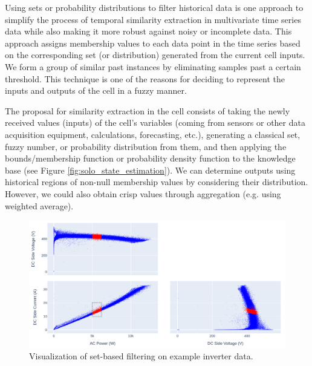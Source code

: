 Using sets or probability distributions to filter historical data is one approach to simplify the process of temporal similarity extraction in multivariate time series data while also making it more robust against noisy or incomplete data. This approach assigns membership values to each data point in the time series based on the corresponding set (or distribution) generated from the current cell inputs. We form a group of similar past instances by eliminating samples past a certain threshold. This technique is one of the reasons for deciding to represent the inputs and outputs of the cell in a fuzzy manner.

The proposal for similarity extraction in the cell consists of taking the newly received values (inputs) of the cell's variables (coming from sensors or other data acquisition equipment, calculations, forecasting, etc.), generating a classical set, fuzzy number, or probability distribution from them, and then applying the bounds/membership function or probability density function to the knowledge base (see Figure \ref{fig:solo_state_estimation}). We can determine outputs using historical regions of non-null membership values by considering their distribution. However, we could also obtain crisp values through aggregation (e.g. using weighted average).


\begin{figure}[h!]
    \centering
    \includegraphics[width=\linewidth]{figures/chapter4/cell/time_extraction.png}
    \caption{Visualization of set-based filtering on example inverter data.}
    \label{fig:time_extraction}
\end{figure}


